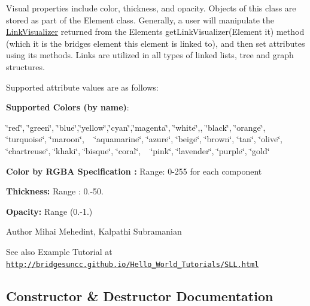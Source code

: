 Visual properties include color, thickness, and opacity. Objects of this class are stored as part of the Element class. Generally, a user will manipulate the \hyperlink{classbridges_1_1link__visualizer_1_1_link_visualizer}{Link\+Visualizer} returned from the Element\textquotesingle{}s get\+Link\+Visualizer(\+Element it) method (which it is the bridges element this element is linked to), and then set attributes using its methods. Links are utilized in all types of linked lists, tree and graph structures.

Supported attribute values are as follows\+:

{\bfseries Supported Colors (by name)}\+: 

\char`\"{}red\char`\"{}, \char`\"{}green\char`\"{}, \char`\"{}blue\char`\"{},\char`\"{}yellow\char`\"{},\char`\"{}cyan\char`\"{},\char`\"{}magenta\char`\"{}, \char`\"{}white\char`\"{},, \char`\"{}black\char`\"{}, \char`\"{}orange\char`\"{}, \char`\"{}turquoise\char`\"{}, \char`\"{}maroon\char`\"{}, ~\newline
 \char`\"{}aquamarine\char`\"{}, \char`\"{}azure\char`\"{}, \char`\"{}beige\char`\"{}, \char`\"{}brown\char`\"{}, \char`\"{}tan\char`\"{}, \char`\"{}olive\char`\"{}, \char`\"{}chartreuse\char`\"{}, \char`\"{}khaki\char`\"{}, \char`\"{}bisque\char`\"{}, \char`\"{}coral\char`\"{}, ~\newline
 \char`\"{}pink\char`\"{}, \char`\"{}lavender\char`\"{}, \char`\"{}purple\char`\"{}, \char`\"{}gold\char`\"{} 

{\bfseries  Color by R\+G\+B\+A Specification \+:} Range\+: 0-\/255 for each component 

{\bfseries  Thickness\+: } Range \+: 0.-\/50.

{\bfseries  Opacity\+: } Range (0.-\/1.) 

\begin{DoxyAuthor}{Author}
Mihai Mehedint, Kalpathi Subramanian
\end{DoxyAuthor}
\begin{DoxySeeAlso}{See also}
Example Tutorial at ~\newline
 \href{http://bridgesuncc.github.io/Hello_World_Tutorials/SLL.html}{\tt http\+://bridgesuncc.\+github.\+io/\+Hello\+\_\+\+World\+\_\+\+Tutorials/\+S\+L\+L.\+html} 
\end{DoxySeeAlso}


\subsection{Constructor \& Destructor Documentation}
\hypertarget{classbridges_1_1link__visualizer_1_1_link_visualizer_a9994004a7808bdcaa6f18ebfd9b7717a}{}
